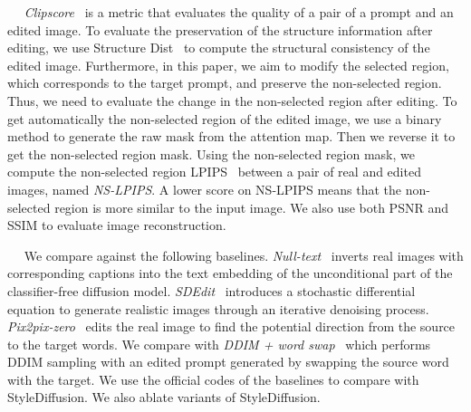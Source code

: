 \documentclass[twocolumn]{svjour3}          \smartqed  \usepackage{graphicx}
\newcommand{\minisection}[1]{\vspace{0.04in} \noindent {\bf #1}\ \ }
\begin{document}
\minisection{Evaluation metrics.}    \textit{Clipscore}~\citep{hessel2021clipscore} is a metric that evaluates the quality of a pair of a prompt and an edited image. To evaluate the preservation of the structure information after editing,  we use Structure Dist~\citep{tumanyan2022splicing} to compute the structural consistency of the edited image.  Furthermore, in this paper, we aim to modify the selected region, which corresponds to the target prompt, and preserve the non-selected region. Thus, we need to evaluate the change in the non-selected region after editing. To get automatically the non-selected region of the edited image, we use a binary method to generate the raw mask from the attention map. Then we reverse it to get the non-selected region mask. Using the non-selected region mask, we compute the non-selected region LPIPS~\citep{zhang2018unreasonable}  between a pair of real and edited images, named \textit{NS-LPIPS}. A lower score on NS-LPIPS means that the non-selected region is more similar to the input image. We also use both PSNR and SSIM to evaluate image reconstruction.

\minisection{Baselines.}
We compare against the following baselines.
\emph{Null-text}~\citep{mokady2022null}  inverts real images with corresponding captions into the text embedding of the unconditional part of the classifier-free diffusion model.  \emph{SDEdit}~\citep{meng2021sdedit} introduces a stochastic differential equation to generate realistic images through an iterative denoising process.  \emph{Pix2pix-zero}~\citep{parmar2023zero} edits the real image to find the potential direction from the source to the target words.   We compare with \textit{DDIM + word swap}~\citep{parmar2023zero} which performs DDIM sampling with an edited prompt generated by swapping the source word with the target. We use the official codes of the baselines to compare with StyleDiffusion. 
We also ablate variants of StyleDiffusion.

\begin{table}[t]
    \setlength{\tabcolsep}{1mm}
\caption{\small Mapping network $M_t$  configuration.
}\label{tab:network}
\end{table}
\end{document}
